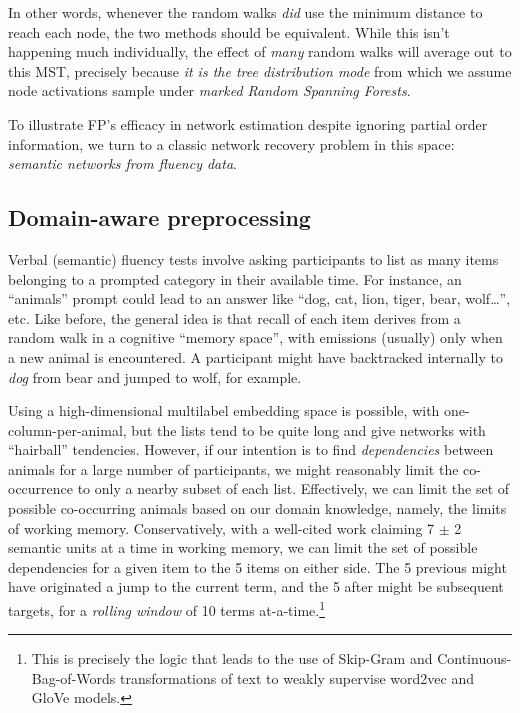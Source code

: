 \documentclass[%
	12pt,
		oneside,
		letterpaper
]{book}
\begin{document}
In other words, whenever the random walks \emph{did} use the minimum
distance to reach each node, the two methods should be equivalent. While
this isn't happening much individually, the effect of \emph{many} random
walks will average out to this MST, precisely because \emph{it is the
tree distribution mode} from which we assume node activations sample
under \emph{marked Random Spanning Forests}.

To illustrate FP's efficacy in network estimation despite ignoring
partial order information, we turn to a classic network recovery problem
in this space: \emph{semantic networks from fluency
data}\autocite{newdissimilaritymeasure_Prescott2006,Estimatingsemanticnetworks_Zemla2018,semanticorganizationanimal_Goni2011}.

\subsection{Domain-aware
preprocessing}\label{domain-aware-preprocessing}

Verbal (semantic) fluency tests involve asking participants to list as
many items belonging to a prompted category in their available time. For
instance, an ``animals'' prompt could lead to an answer like ``dog, cat,
lion, tiger, bear, wolf\ldots{}'', etc. Like before, the general idea is
that recall of each item derives from a random walk in a cognitive
``memory space'', with emissions (usually) only when a new animal is
encountered. A participant might have backtracked internally to
\emph{dog} from bear and jumped to wolf, for example.

Using a high-dimensional multilabel embedding space is possible, with
one-column-per-animal, but the lists tend to be quite long and give
networks with ``hairball'' tendencies. However, if our intention is to
find \emph{dependencies} between animals for a large number of
participants, we might reasonably limit the co-occurrence to only a
nearby subset of each list. Effectively, we can limit the set of
possible co-occurring animals based on our domain knowledge, namely, the
limits of working memory. Conservatively, with a well-cited work
claiming 7 \(\pm\) 2 semantic units at a time in working
memory\autocite{magicalnumberseven_Miller1956}, we can limit the set of
possible dependencies for a given item to the 5 items on either side.
The 5 previous might have originated a jump to the current term, and the
5 after might be subsequent targets, for a \emph{rolling window} of 10
terms at-a-time.\footnote{ This is precisely the logic that leads to the
  use of Skip-Gram and Continuous-Bag-of-Words transformations of text
  to weakly supervise word2vec and GloVe
  models\autocite{GloveGlobalvectors_Pennington2014,Efficientestimationword_Mikolov2013}.}
\end{document}

